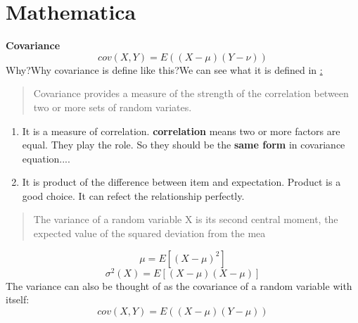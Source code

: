 \documentclass[12pt]{article}
\begin{document}
\section {Mathematica}
\textbf{Covariance}
\begin{equation}
cov(X,Y) = E((X-\mu)(Y-\nu))
\end{equation}
Why?Why covariance is define like this?We can see what it is defined in \href{http://mathworld.wolfram.com/Covariance.html{mathworld}}:
\begin{quote}
Covariance provides a measure of the strength of the correlation between two or more sets of random variates.
\end{quote}

\begin{enumerate}
	\item It is a measure of correlation. \textbf{correlation} means two or more factors are equal. They play the role. So they should be the \textbf{same form} in covariance equation.... 
	\item It is product of the difference between item and expectation. Product is a good choice. It can refect the relationship perfectly. 
\end{enumerate}

\begin{quote}
The variance of a random variable X is its second central moment, the expected value of the squared deviation from the mea 
\end{quote}
	\begin{equation}
	\mu = E[(X-\mu)^2]
	\end{equation}
\begin{equation}
	\sigma^2(X) = E[(X-\mu)(X-\mu)]
\end{equation}
The variance can also be thought of as the covariance of a random variable with itself:
\begin{equation}
	cov(X,Y) = E((X-\mu)(Y-\mu))
\end{equation}
\end{document}
